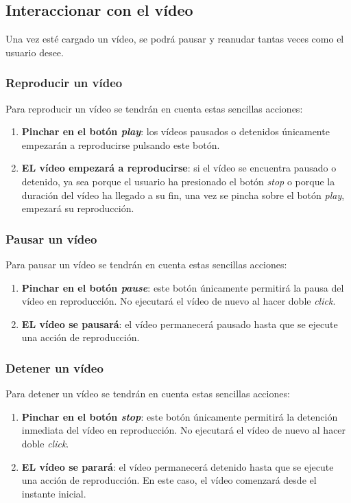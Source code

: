 \subsection{Interaccionar con el vídeo}
Una vez esté cargado un vídeo, se podrá pausar y reanudar tantas veces como el usuario desee. 

\subsubsection{Reproducir un vídeo}
Para reproducir un vídeo se tendrán en cuenta estas sencillas acciones:
\begin{enumerate}
    \item \textbf{Pinchar en el botón \textit{play}}: los vídeos pausados o detenidos únicamente empezarán  a reproducirse pulsando este botón. 
    \item \textbf{EL vídeo empezará a reproducirse}: si el vídeo se encuentra pausado o detenido, ya sea porque el usuario ha presionado el botón \textit{stop} o porque la duración del vídeo ha llegado a su fin, una vez se pincha sobre el botón \textit{play}, empezará su reproducción.
\end{enumerate}

\newpage
\subsubsection{Pausar un vídeo}
Para pausar un vídeo se tendrán en cuenta estas sencillas acciones:
\begin{enumerate}
    \item \textbf{Pinchar en el botón \textit{pause}}: este botón únicamente permitirá la pausa del vídeo en reproducción. No ejecutará el vídeo de nuevo al hacer doble \textit{click}.
    \item \textbf{EL vídeo se pausará}: el vídeo permanecerá pausado hasta que se ejecute una acción de reproducción. 
\end{enumerate}

\subsubsection{Detener un vídeo}
Para detener un vídeo se tendrán en cuenta estas sencillas acciones:
\begin{enumerate}
    \item \textbf{Pinchar en el botón \textit{stop}}: este botón únicamente permitirá la detención inmediata del vídeo en reproducción. No ejecutará el vídeo de nuevo al hacer doble \textit{click}. 
    \item \textbf{EL vídeo se parará}: el vídeo permanecerá detenido hasta que se ejecute una acción de reproducción. En este caso, el vídeo comenzará desde el instante inicial.
\end{enumerate}


